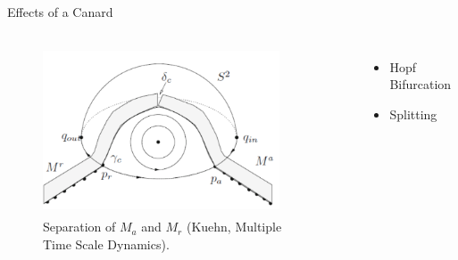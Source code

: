 \documentclass[11pt]{beamer}
\begin{document}
\begin{frame}{Effects of a Canard}
\begin{columns}
\begin{figure}
    
\includegraphics[height=5cm,width=7cm]{Images/Separation}
    \caption{Separation of $ M_a $ and $ M_r $ (Kuehn, Multiple Time Scale Dynamics).}

\end{figure}
\begin{itemize}
\item Hopf Bifurcation
\item Splitting 

\end{itemize}
\end{columns}
\end{frame}
\end{document}
